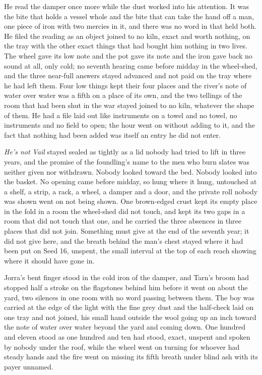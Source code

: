 He read the damper once more while the dust worked into his attention. It was the bite that holds a vessel whole and the bite that can take the hand off a man, one piece of iron with two mercies in it, and there was no word in  that held both. He filed the reading as an object joined to no kiln, exact and worth nothing, on the tray with the other exact things that had bought him nothing in two lives. The wheel gave its low note and the pot gave its note and the iron gave back no sound at all, only cold; no seventh hearing came before midday in the wheel-shed, and the three near-full answers stayed advanced and not paid on the tray where he had left them. Four low things kept their four places and the river's note of water over water was a fifth on a place of its own, and the two tellings of the room that had been shut in the war stayed joined to no kiln, whatever the shape of them. He had a file laid out like instruments on a towel and no towel, no instruments and no field to open; the hour went on without adding to it, and the fact that nothing had been added was itself an entry he did not enter.

\emph{He's not Vail} stayed sealed as tightly as a lid nobody had tried to lift in three years, and the promise of the foundling's name to the men who burn slates was neither given nor withdrawn. Nobody looked toward the bed. Nobody looked into the basket. No opening came before midday, so  hung where it hung, untouched at a shelf, a strip, a rack, a wheel, a damper and a door, and the private roll nobody was shown went on not being shown. One brown-edged crust kept its empty place in the fold in a room the wheel-shed did not touch, and  kept its two gaps in a room that did not touch that one, and he carried the three absences in three places that did not join. Something must give at the end of the seventh year; it did not give here, and the breath behind the man's chest stayed where it had been put on Seed 16, unspent, the small interval at the top of each reach showing where it should have gone in.

Jorra's bent finger stood in the cold iron of the damper, and Tarn's broom had stopped half a stroke on the flagstones behind him before it went on about the yard, two silences in one room with no word passing between them. The boy was carried at the edge of the light with the fine grey dust and the half-check laid on one tray and not joined, his small hand outside the wool going up an inch toward the note of water over water beyond the yard and coming down. One hundred and eleven stood as one hundred and ten had stood, exact, unspent and spoken by nobody under the roof, while the wheel went on turning for whoever had steady hands and the fire went on missing its fifth breath under blind ash with its payer unnamed.
